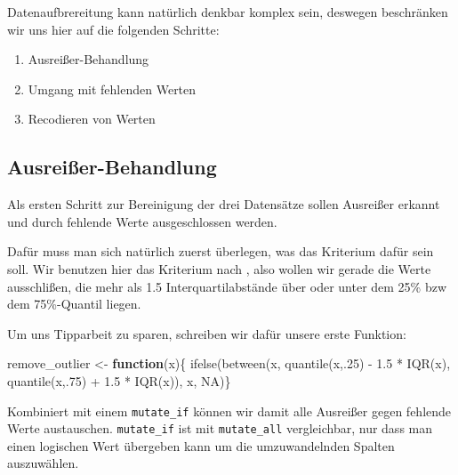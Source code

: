 \documentclass[
]{book}
\newenvironment{Shaded}{\begin{snugshade}}{\end{snugshade}}
\newcommand{\ConstantTok}[1]{\textcolor[rgb]{0.00,0.00,0.00}{#1}}
\newcommand{\ControlFlowTok}[1]{\textcolor[rgb]{0.13,0.29,0.53}{\textbf{#1}}}
\newcommand{\DecValTok}[1]{\textcolor[rgb]{0.00,0.00,0.81}{#1}}
\newcommand{\FloatTok}[1]{\textcolor[rgb]{0.00,0.00,0.81}{#1}}
\newcommand{\FunctionTok}[1]{\textcolor[rgb]{0.00,0.00,0.00}{#1}}
\newcommand{\NormalTok}[1]{#1}
\newcommand{\OtherTok}[1]{\textcolor[rgb]{0.56,0.35,0.01}{#1}}
\newcommand{\SpecialCharTok}[1]{\textcolor[rgb]{0.00,0.00,0.00}{#1}}
\begin{document}
Datenaufbrereitung kann natürlich denkbar komplex sein, deswegen beschränken wir uns hier auf die folgenden Schritte:

\begin{enumerate}
\def\labelenumi{\arabic{enumi}.}
\item
  Ausreißer-Behandlung
\item
  Umgang mit fehlenden Werten
\item
  Recodieren von Werten
\end{enumerate}

\hypertarget{ausreiuxdfer-behandlung}{%
\subsection{Ausreißer-Behandlung}\label{ausreiuxdfer-behandlung}}

Als ersten Schritt zur Bereinigung der drei Datensätze sollen Ausreißer erkannt und durch fehlende Werte ausgeschlossen werden.

Dafür muss man sich natürlich zuerst überlegen, was das Kriterium dafür sein soll. Wir benutzen hier das Kriterium nach \citet{tukeyExploratoryDataAnalysis1977}, also wollen wir gerade die Werte ausschlißen, die mehr als 1.5 Interquartilabstände über oder unter dem 25\% bzw dem 75\%-Quantil liegen.

Um uns Tipparbeit zu sparen, schreiben wir dafür unsere erste Funktion:

\begin{Shaded}
\begin{Highlighting}[]
\NormalTok{remove\_outlier }\OtherTok{\textless{}{-}} \ControlFlowTok{function}\NormalTok{(x)\{}
  \FunctionTok{ifelse}\NormalTok{(}\FunctionTok{between}\NormalTok{(x,}
                 \FunctionTok{quantile}\NormalTok{(x,.}\DecValTok{25}\NormalTok{) }\SpecialCharTok{{-}} \FloatTok{1.5} \SpecialCharTok{*} \FunctionTok{IQR}\NormalTok{(x),}
                 \FunctionTok{quantile}\NormalTok{(x,.}\DecValTok{75}\NormalTok{) }\SpecialCharTok{+} \FloatTok{1.5} \SpecialCharTok{*} \FunctionTok{IQR}\NormalTok{(x)),}
\NormalTok{          x,}
          \ConstantTok{NA}\NormalTok{)\}}
\end{Highlighting}
\end{Shaded}

Kombiniert mit einem \texttt{mutate\_if} können wir damit alle Ausreißer gegen fehlende Werte austauschen. \texttt{mutate\_if} ist mit \texttt{mutate\_all} vergleichbar, nur dass man einen logischen Wert übergeben kann um die umzuwandelnden Spalten auszuwählen.
\end{document}
